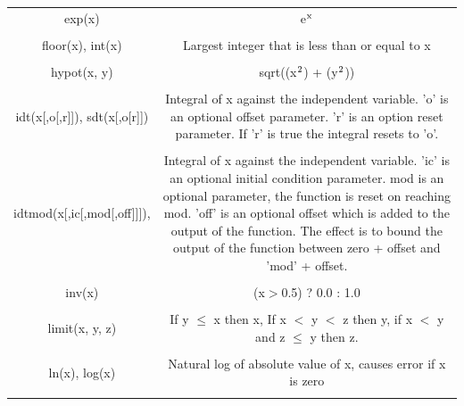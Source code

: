 \begin{longtable}{c c}
exp(x) & \begin{minipage}{20em}
e$\rm{^x}$
\end{minipage}\\ \\

floor(x), int(x) & \begin{minipage}{20em}
Largest integer that is less than or equal to x
\end{minipage}\\ \\

hypot(x, y) & \begin{minipage}{20em}
sqrt((x$\rm{^2}$) + (y$\rm{^2}$))
\end{minipage}\\ \\

idt(x[,o[,r]]), sdt(x[,o[r]]) & \begin{minipage}{20em}
Integral of x against the independent variable. 'o' is an optional offset parameter. 'r' is an option reset parameter. If 'r' is true the integral resets to 'o'.
\end{minipage}\\ \\

idtmod(x[,ic[,mod[,off]]]), & \begin{minipage}{20em}
Integral of x against the independent variable. 'ic' is an optional initial condition parameter. mod is an optional parameter, the function is reset on reaching mod. 'off' is an optional offset which is added to the output of the function. The effect is to bound the output of the function between zero + offset and 'mod' + offset.
\end{minipage}\\ \\

inv(x) & \begin{minipage}{20em}
(x$>$0.5) ? 0.0 : 1.0
\end{minipage}\\ \\

limit(x, y, z) & \begin{minipage}{20em}
If y $\leq$ x then x, If x $<$ y $<$ z then y, if x $<$ y and z $\leq$ y then z.  
\end{minipage}\\ \\

ln(x), log(x) & \begin{minipage}{20em}
Natural log of absolute value of x, causes error if x is zero
\end{minipage}\\ \\


\end{longtable}
